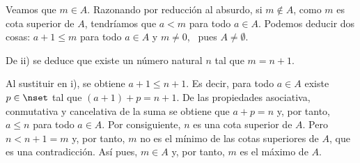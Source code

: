 Veamos que $m \in A$. Razonando por reducción al absurdo, si $m \notin A$,
como $m$ es cota superior de $A$, tendríamos que $a < m$ para todo $a \in
A$. Podemos deducir dos cosas: $a + 1 \leq m$ para todo $a \in A$ y $m \neq
0$, \ pues $A \neq \emptyset$.

De ii) se deduce que existe un número natural $n$ tal que $m = n + 1$.

Al sustituir en i), se obtiene $a + 1 \leq n + 1$. Es decir, para todo $a
\in A$ existe $p \in \nset$ tal que $(a + 1) + p = n + 1$. De las
propiedades asociativa, conmutativa y cancelativa de la suma se obtiene que
$a + p = n$ y, por tanto, $a \leq n$ para todo $a \in A$. Por consiguiente,
$n$ es una cota superior de $A$. Pero $n < n + 1 = m$ y, por tanto, $m$ no
es el mínimo de las cotas superiores de $A$, que es una contradicción. Así
pues, $m \in A$ y, por tanto, $m$ es el máximo de $A$.
















